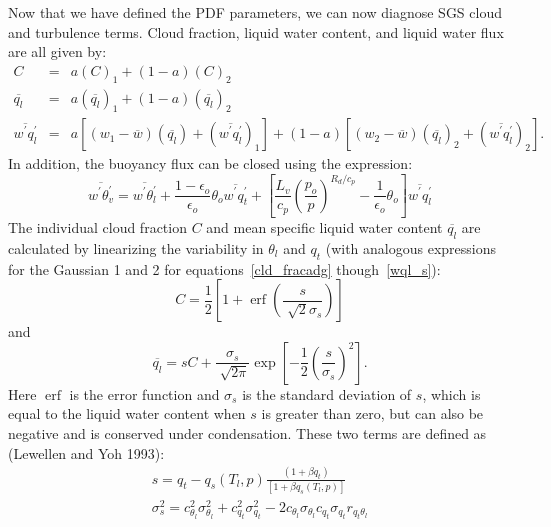 \documentclass[12pt,titlepage]{article}
\numberwithin{equation}{section}
\begin{document}
Now that we have defined the PDF parameters, we can now diagnose SGS cloud and turbulence terms.  Cloud fraction, liquid water content, and liquid water flux are all given by:
%
\begin{eqnarray}
  C &=& a(C)_{1}+(1-a)(C)_{2} \label{turb_terms}\\
  \overline{q_{l}} &=& a(\overline{q_{l}})_{1}+(1-a)(\overline{q_{l}})_{2} \nonumber \\
  \overline{w^{'}q_{l}^{'}} &=& a[(w_{1}-\overline{w})(\overline{q_{l}})+(\overline{w^{'}q_{l}^{'}})_{1}]+(1-a)[(w_{2}-\overline{w})(\overline{q_{l}})_{2}+(\overline{w^{'}q_{l}^{'}})_{2}] . \nonumber
\end{eqnarray}
%
In addition, the buoyancy flux can be closed using the expression:
%
\begin{equation}
  \overline{w^{'}\theta_{v}^{'}}=\overline{w^{'}\theta_{l}^{'}}+\frac{1-\epsilon_{o}}{\epsilon_{o}}\theta_{o}\overline{w^{'}q_{t}^{'}}+\left[\frac{L_{v}}{c_{p}}\left(\frac{p_{o}}{p}\right)^{R_{d}/c_{p}}-\frac{1}{\epsilon_{o}}\theta_{o}\right]\overline{w^{'}q_{l}^{'}}
  \label{buoyancy}
\end{equation}
%
The individual cloud fraction $C$ and mean specific liquid water content $\overline{q_{l}}$ are calculated by linearizing the variability in $\theta_{l}$ and $q_{t}$ (with analogous expressions for the Gaussian 1 and 2 for equations~\ref{cld_fracadg} though~\ref{wql_s}): 
%
\begin{equation}
 C=\frac{1}{2}\left[1+\operatorname{erf}\left(\frac{s}{\sqrt[]{2}\sigma_{s}}\right)\right]
  \label{cld_fracadg}
\end{equation}
% 
and
% 
\begin{equation}
  \overline{q_{l}}=sC+\frac{\sigma_{s}}{\sqrt[]{2\pi}}\exp\left[-\frac{1}{2}\left(\frac{s}{\sigma_{s}}\right)^{2}\right].
  \label{ql_adg}
\end{equation}
%
Here $\operatorname{erf}$ is the error function and $\sigma_{s}$ is the standard deviation of $s$, which is equal to the liquid water content when $s$ is greater than zero, but can also be negative and is conserved under condensation.  These two terms are defined as (Lewellen and Yoh 1993):
%
\begin{equation}
  \begin{split}
    s=q_{t}-q_{s}(T_{l},p)\frac{(1+\beta q_{t})}{[1+\beta q_{s}(T_{l},p)]}\\
  \sigma_{s}^{2}=c_{\theta_{l}}^{2}\sigma_{\theta_{l}}^{2}+c_{q_{t}}^{2}\sigma_{q_{t}}^{2}-2c_{\theta_{l}}\sigma_{\theta_{l}}c_{q_{t}}\sigma_{q_{t}}r_{q_{t}\theta_{l}}
  \end{split}
  \label{sterms}
\end{equation}
\end{document}
